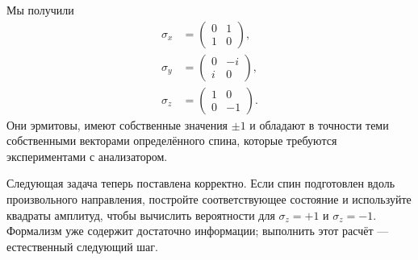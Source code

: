 \begin{classroomqa}
\end{classroomqa}

Мы получили
\begin{equation}
\begin{aligned}
\sigma_x&=\begin{pmatrix}0&1\\1&0\end{pmatrix},\\[0.4em]
\sigma_y&=\begin{pmatrix}0&-i\\i&0\end{pmatrix},\\[0.4em]
\sigma_z&=\begin{pmatrix}1&0\\0&-1\end{pmatrix}.
\end{aligned}
\label{eq:pauli-triple}
\end{equation}
Они эрмитовы, имеют собственные значения \(\pm1\) и обладают в точности теми собственными векторами определённого спина, которые требуются экспериментами с анализатором.

Следующая задача теперь поставлена корректно. Если спин подготовлен вдоль произвольного направления, постройте соответствующее состояние и используйте квадраты амплитуд, чтобы вычислить вероятности для \(\sigma_z=+1\) и \(\sigma_z=-1\). Формализм уже содержит достаточно информации; выполнить этот расчёт — естественный следующий шаг.

